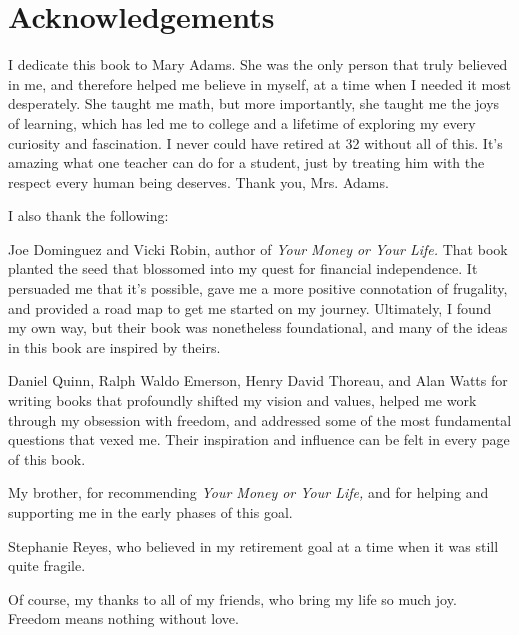 \chapter{Acknowledgements}
I dedicate this book to Mary Adams. She was the only person that truly believed in me, and therefore helped me believe in myself, at a time when I needed it most desperately. She taught me math, but more importantly, she taught me the joys of learning, which has led me to college and a lifetime of exploring my every curiosity and fascination. I never could have retired at 32 without all of this. It's amazing what one teacher can do for a student, just by treating him with the respect every human being deserves. Thank you, Mrs. Adams.

I also thank the following:

Joe Dominguez and Vicki Robin, author of \emph{Your Money or Your Life.} That book planted the seed that blossomed into my quest for financial independence. It persuaded me that it's possible, gave me a more positive connotation of frugality, and provided a road map to get me started on my journey. Ultimately, I found my own way, but their book was nonetheless foundational, and many of the ideas in this book are inspired by theirs.

Daniel Quinn, Ralph Waldo Emerson, Henry David Thoreau, and Alan Watts for writing books that profoundly shifted my vision and values, helped me work through my obsession with freedom, and addressed some of the most fundamental questions that vexed me. Their inspiration and influence can be felt in every page of this book.

My brother, for recommending \emph{Your Money or Your Life,} and for helping and supporting me in the early phases of this goal.

Stephanie Reyes, who believed in my retirement goal at a time when it was still quite fragile.

Of course, my thanks to all of my friends, who bring my life so much joy. Freedom means nothing without love.
